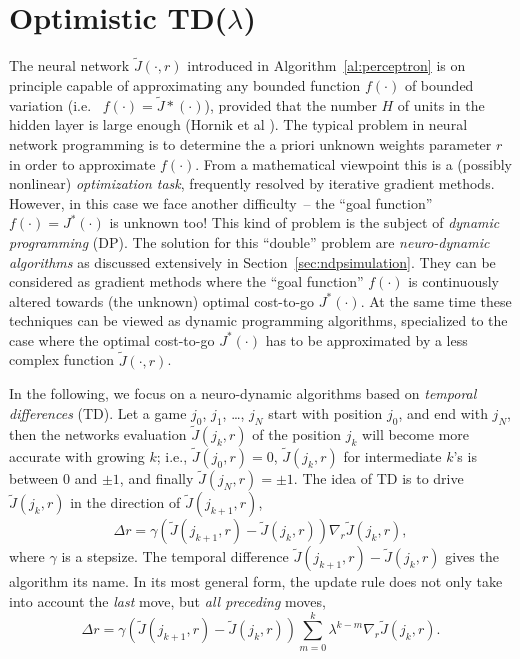 \section{Optimistic TD($\lambda$)} \label{sec:impl:opti}
The neural network $\tilde J(\cdot,r)$ introduced in Algorithm~\ref{al:perceptron} is on principle capable of approximating any bounded function $f(\cdot)$ of bounded variation (i.e.~ $f(\cdot)=\tilde J*(\cdot)$), provided that the number $H$ of units in the hidden layer is large enough (Hornik et al \cite{Hornik89}). The typical problem in neural network programming is to determine the a priori unknown weights parameter $r$ in order to approximate $f(\cdot)$. From a mathematical viewpoint this is a (possibly nonlinear) \emph{optimization task}, frequently resolved by iterative gradient methods. However, in this case we face another difficulty~-- the ``goal function'' $f(\cdot) = J^*(\cdot)$ is unknown too! This kind of problem is the subject of \emph{dynamic programming} (DP). The solution for this ``double'' problem are \emph{neuro-dynamic algorithms} as discussed extensively in Section~\ref{sec:ndpsimulation}. They can be considered as gradient methods where the ``goal function'' $f(\cdot)$ is continuously altered towards (the unknown) optimal cost-to-go $J^*(\cdot)$. At the same time these techniques can be viewed as dynamic programming algorithms, specialized to the case where the optimal cost-to-go $J^*(\cdot)$ has to be approximated by a less complex function $\tilde J(\cdot,r)$.

In the following, we focus on a neuro-dynamic algorithms based on \emph{temporal differences} (TD). Let a game $j_0$, $j_1$, \ldots, $j_N$ start with position $j_0$, and end with $j_N$, then the networks evaluation $\tilde J(j_k,r)$ of the position $j_k$ will become more accurate with growing $k$; i.e., $\tilde J(j_0,r) = 0$, $\tilde J(j_k,r)$ for intermediate $k$'s is between 0 and $\pm1$, and finally $\tilde J(j_N,r)=\pm1$. The idea of TD is to drive $\tilde J(j_k,r)$ in the direction of $\tilde J(j_{k+1},r)$,
$$\Delta r = \gamma \left(\tilde J(j_{k+1},r) - \tilde J(j_k,r) \right) \nabla_r \tilde J(j_k,r),$$
where $\gamma$ is a stepsize. The temporal difference $\tilde J(j_{k+1},r) - \tilde J(j_k,r)$ gives the algorithm its name. In its most general form, the update rule does not only take into account the \emph{last} move, but \emph{all preceding} moves,
$$\Delta r = \gamma \left(\tilde J(j_{k+1},r) - \tilde J(j_k,r) \right) \sum_{m=0}^k \lambda^{k-m} \nabla_r \tilde J(j_k,r).$$ 

